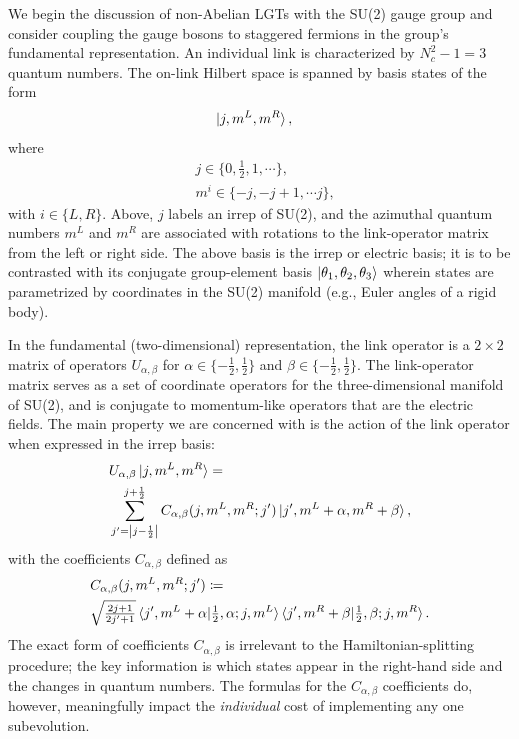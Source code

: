 \documentclass[aps,prd,twocolumn,showpacs,groupedaddress,superscriptaddress,nofootinbib,floatfix,preprintnumbers,longbibliography]{revtex4-1}
\begin{document}
We begin the discussion of non-Abelian LGTs with the SU(2) gauge group and consider coupling the gauge bosons to staggered fermions in the group's fundamental representation. An individual link is characterized by $N_c^2-1=3$ quantum numbers. The on-link Hilbert space is spanned by basis states of the form
%
\begin{align}
    &\ket{j,m^L,m^R} ,
\end{align}
%
where
%
\begin{align}
    &j \in \{0,\tfrac{1}{2}, 1, \cdots\}, \\
    &m^i \in \{-j,-j+1,\cdots j\},
\end{align}
%
with $i\in\{L,R\}$.
Above, $j$ labels an irrep of SU(2), and the azimuthal quantum numbers $m^L$ and $m^R$ are associated with rotations to the link-operator matrix from the left or right side. The above basis is the irrep or electric basis; it is to be contrasted with its conjugate group-element basis $\ket{ \theta_1 , \theta_2 , \theta_3 }$ wherein states are parametrized by coordinates in the SU(2) manifold (e.g., Euler angles of a rigid body).

In the fundamental (two-dimensional) representation, the link operator is a $2\times2$ matrix of operators $U_{\alpha,\beta}$ for $\alpha \in \{-\frac{1}{2},\frac{1}{2}\}$ and $ \beta \in \{-\frac{1}{2},\frac{1}{2}\}$. The link-operator matrix serves as a set of coordinate operators for the three-dimensional manifold of SU(2), and is conjugate to momentum-like operators that are the electric fields. The main property we are concerned with is the action of the link operator when expressed in the irrep basis:
%
\begin{align}
    &U_{\alpha,\beta} \ket{j , m^L , m^R}  = \nonumber \\  
    &\sum_{j' = \left| j - \frac{1}{2} \right| }^{j + \frac{1}{2}}
    C_{\alpha,\beta}(j,m^L,m^R;j')
    \ket{j' , m^L 
    +\alpha , m^R + \beta},
    \label{eq:SU(2)-link} 
\end{align}
%
with the coefficients $C_{\alpha,\beta}$ defined as
%
\begin{align}
    &C_{\alpha,\beta}(j,m^L,m^R;j') \coloneq  \nonumber\\
    &\sqrt{\tfrac{2j+1}{2j'+1}} \braket{
    j', m^L +\alpha | \tfrac{1}{2}, \alpha ; j, m^L 
    } \braket{ j', m^R + \beta | \tfrac{1}{2}, \beta ; j, m^R} .
    \label{eq:SU(2)-coefficients}
\end{align}
%
The exact form of coefficients $C_{\alpha,\beta}$ is irrelevant to the Hamiltonian-splitting procedure; the key information is which states appear in the right-hand side and the changes in quantum numbers.
The formulas for the $C_{\alpha,\beta}$ coefficients do, however, meaningfully impact the \emph{individual} cost of implementing any one subevolution.
 
\end{document}
